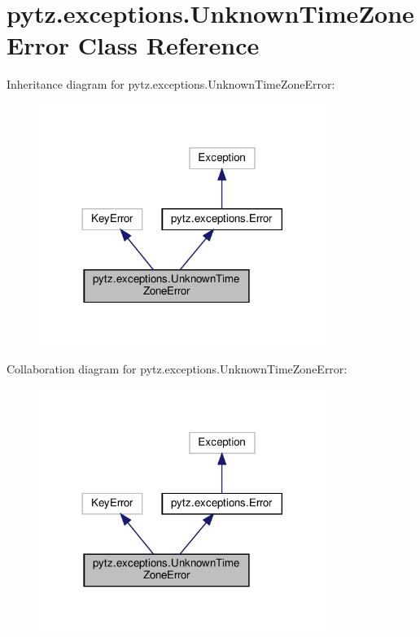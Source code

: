 \hypertarget{classpytz_1_1exceptions_1_1UnknownTimeZoneError}{}\section{pytz.\+exceptions.\+Unknown\+Time\+Zone\+Error Class Reference}
\label{classpytz_1_1exceptions_1_1UnknownTimeZoneError}


Inheritance diagram for pytz.\+exceptions.\+Unknown\+Time\+Zone\+Error\+:
\nopagebreak
\begin{figure}[H]
\begin{center}
\leavevmode
\includegraphics[width=264pt]{classpytz_1_1exceptions_1_1UnknownTimeZoneError__inherit__graph}
\end{center}
\end{figure}


Collaboration diagram for pytz.\+exceptions.\+Unknown\+Time\+Zone\+Error\+:
\nopagebreak
\begin{figure}[H]
\begin{center}
\leavevmode
\includegraphics[width=264pt]{classpytz_1_1exceptions_1_1UnknownTimeZoneError__coll__graph}
\end{center}
\end{figure}


